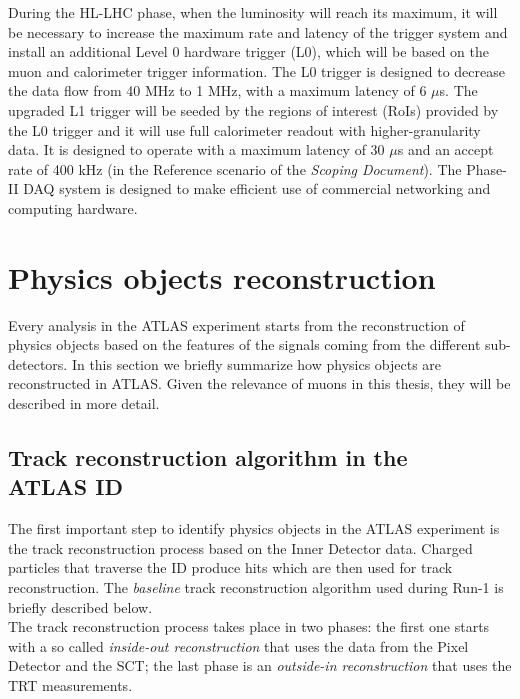 \documentclass[a4paper,twoside,12pt]{book}
\begin{document}
During the HL-LHC phase, when the luminosity will reach its maximum, it will be necessary
to increase the maximum rate and latency of the trigger system and install an additional Level 0 hardware trigger (L0), which will be based on the muon and calorimeter trigger information. The L0 trigger is designed to decrease the data flow from 40 MHz to 1 MHz, with a maximum latency of 6 $\mu$s. The upgraded L1 trigger will be seeded by the regions of interest (RoIs) provided by the L0 
trigger and it will use full calorimeter readout with higher-granularity data. It is designed to
operate with a maximum latency of 30 $\mu$s and an accept rate of 400 kHz (in the Reference scenario of the \textit{Scoping Document}\cite{scoping}). The Phase-II DAQ system is designed to make 
efficient use of commercial networking and computing hardware. 

\clearpage


\chapter{Physics objects reconstruction}

Every analysis in the ATLAS experiment starts from the reconstruction of physics objects
based on the features of the signals coming from the different sub-detectors\cite{PhysicsObjectReconstruction}. In this section we briefly
summarize how physics objects are reconstructed in ATLAS. Given the relevance of muons in this thesis, they will be described in more detail.\\

\section{Track reconstruction algorithm in the \\ 
ATLAS ID}
The first important step to identify physics objects in the ATLAS experiment is the track reconstruction process based on the Inner Detector data. Charged particles that
traverse the ID produce hits which are then used for track reconstruction. The \textit{baseline} track reconstruction
algorithm\cite{OptimizationTrackReconstructionAlgorithm} used during Run-1 is briefly described below.\\

The track reconstruction process takes place in two phases: the first one starts with a so called \textit{inside-out reconstruction} that uses the data from the Pixel Detector and the SCT; the last phase is an \textit{outside-in reconstruction} that uses the TRT measurements. \\
\end{document}
